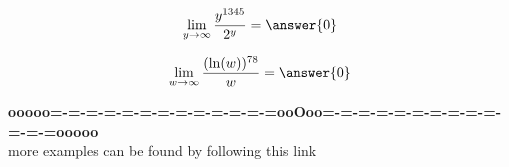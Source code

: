 \documentclass{ximera}
\begin{document}
\begin{question}

\[
\lim\limits_{y \to \infty} \frac{y^{1345}}{2^y} = \answer{0}
\]

\end{question}












\begin{question}

\[
\lim\limits_{w \to \infty} \frac{(\ln(w))^{78}}{w} = \answer{0}
\]

\end{question}



















\begin{center}
\textbf{\textcolor{green!50!black}{ooooo=-=-=-=-=-=-=-=-=-=-=-=-=ooOoo=-=-=-=-=-=-=-=-=-=-=-=-=ooooo}} \\

more examples can be found by following this link\\ 

\end{center}
\end{document}
